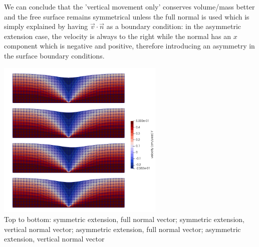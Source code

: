 We can conclude that the 'vertical movement only' conserves volume/mass better and the free surface remains symmetrical unless the full normal is used which is simply explained by having $\vec{v}\cdot\vec{n}$ as a boundary condition: in the asymmetric extension case, the velocity is always to the right while the normal has an $x$ component which is negative and positive, therefore introducing an asymmetry in the surface boundary conditions.

\begin{center}
\includegraphics[width=8cm]{python_codes/fieldstone_54/images/exp4-5/v}\\
{\scriptsize Top to bottom: 
symmetric extension, full normal vector; 
symmetric extension, vertical normal vector; 
asymmetric extension, full normal vector; 
asymmetric extension, vertical normal vector}
\end{center}


